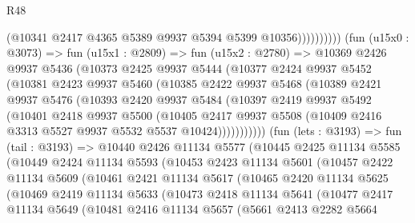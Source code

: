 \begin{lexlean}{R48}
\begin{coremodule}
                          (@10341 @2417 @4365 @5389 @9937 @5394 @5399 @10356))))))))))
        (fun (u15x0 : @3073) =>
        fun (u15x1 : @2809) =>
        fun (u15x2 : @2780) =>
        @10369
          @2426
          @9937
          @5436
          (@10373
            @2425
            @9937
            @5444
            (@10377
              @2424
              @9937
              @5452
              (@10381
                @2423
                @9937
                @5460
                (@10385
                  @2422
                  @9937
                  @5468
                  (@10389
                    @2421
                    @9937
                    @5476
                    (@10393
                      @2420
                      @9937
                      @5484
                      (@10397
                        @2419
                        @9937
                        @5492
                        (@10401
                          @2418
                          @9937
                          @5500
                          (@10405
                            @2417
                            @9937
                            @5508
                            (@10409 @2416 @3313 @5527 @9937 @5532 @5537 @10424)))))))))))
        (fun (lets : @3193) =>
        fun (tail : @3193) =>
        @10440
          @2426
          @11134
          @5577
          (@10445
            @2425
            @11134
            @5585
            (@10449
              @2424
              @11134
              @5593
              (@10453
                @2423
                @11134
                @5601
                (@10457
                  @2422
                  @11134
                  @5609
                  (@10461
                    @2421
                    @11134
                    @5617
                    (@10465
                      @2420
                      @11134
                      @5625
                      (@10469
                        @2419
                        @11134
                        @5633
                        (@10473
                          @2418
                          @11134
                          @5641
                          (@10477
                            @2417
                            @11134
                            @5649
                            (@10481
                              @2416
                              @11134
                              @5657
                              (@5661
                                @2413
                                @2282
                                @5664

\end{coremodule}
\end{lexlean}
